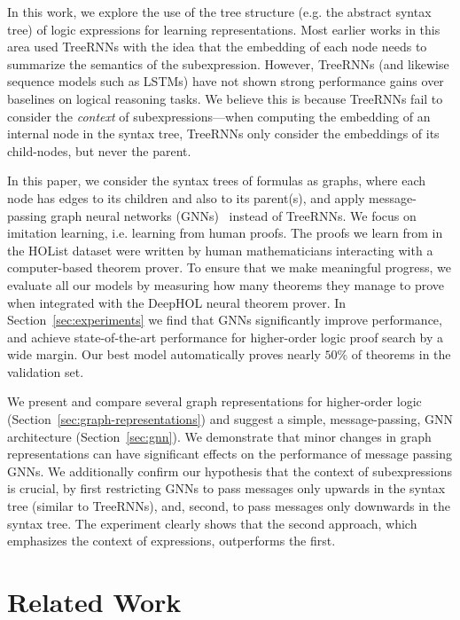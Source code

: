 \documentclass[letterpaper]{article} \usepackage{aaai20}  \usepackage{times}  \usepackage{helvet} \usepackage{courier}  \usepackage[hyphens]{url}  \usepackage{graphicx} \urlstyle{rm} \def\UrlFont{\rm}  \usepackage{graphicx}  \frenchspacing  \setlength{\pdfpagewidth}{8.5in}  \setlength{\pdfpageheight}{11in}
\newcommand{\citep}{\cite}
\begin{document}
In this work, we explore the use of the tree structure (e.g. the abstract syntax tree) of logic expressions for learning representations.
Most earlier works in this area used TreeRNNs with the idea that the embedding of each node needs to summarize the semantics of the subexpression.
However, TreeRNNs (and likewise sequence models such as LSTMs) have not shown strong performance gains over baselines on logical reasoning tasks.
We believe this is because TreeRNNs fail to consider the \emph{context} of subexpressions---when computing the embedding of an internal node in the syntax tree, TreeRNNs only consider the embeddings of its child-nodes, but never the parent.

In this paper, we consider the syntax trees of formulas as graphs, where each node has edges to its children and also to its parent(s), and apply message-passing graph neural networks (GNNs)~\citep{scarselli2009graph,li2015gated,GilmerSRVD17,gnn_survey_2019} instead of TreeRNNs.
We focus on imitation learning, i.e. learning from human proofs.
The proofs we learn from in the HOList dataset were written by human mathematicians interacting with a computer-based theorem prover.
To ensure that we make meaningful progress, we evaluate all our models by measuring how many theorems they manage to prove when integrated with the DeepHOL neural theorem prover.
In Section~\ref{sec:experiments} we find that GNNs significantly improve performance, and achieve state-of-the-art performance for higher-order logic proof search by a wide margin.
Our best model automatically proves nearly $50\%$ of theorems in the validation set.

We present and compare several graph representations for higher-order logic (Section~\ref{sec:graph-representations}) and suggest a simple, message-passing, GNN architecture (Section~\ref{sec:gnn}).
We demonstrate that minor changes in graph representations can have significant effects on the performance of message passing GNNs.
We additionally confirm our hypothesis that the context of subexpressions is crucial, by first restricting GNNs to pass messages only upwards in the syntax tree (similar to TreeRNNs), and, second, to pass messages only downwards in the syntax tree.
The experiment clearly shows that the second approach, which emphasizes the context of expressions, outperforms the first.
 
\section{Related Work}
\label{sec:related-work}
\end{document}

